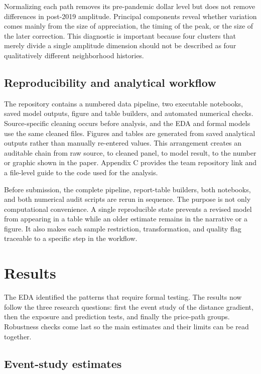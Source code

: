 \documentclass[11pt]{article}
\begin{document}
Normalizing each path removes its pre-pandemic dollar level but does not remove differences in post-2019 amplitude. Principal
components reveal whether variation comes mainly from the size of appreciation, the timing of the peak, or the size of the later
correction. This diagnostic is important because four clusters that merely divide a single amplitude dimension should not be
described as four qualitatively different neighborhood histories.

\subsection{Reproducibility and analytical workflow}

The repository contains a numbered data pipeline, two executable notebooks, saved model outputs, figure and table builders, and
automated numerical checks. Source-specific cleaning occurs before analysis, and the EDA and formal models use the same cleaned
files. Figures and tables are generated from saved analytical outputs rather than manually re-entered values. This arrangement
creates an auditable chain from raw source, to cleaned panel, to model result, to the number or graphic shown in the paper.
Appendix C provides the team repository link and a file-level guide to the code used for the analysis.

Before submission, the complete pipeline, report-table builders, both notebooks, and both numerical audit scripts are rerun in
sequence. The purpose is not only computational convenience. A single reproducible state prevents a revised model from appearing
in a table while an older estimate remains in the narrative or a figure. It also makes each sample restriction, transformation,
and quality flag traceable to a specific step in the workflow.

\section{Results}

The EDA identified the patterns that require formal testing. The results now follow the three research questions: first the event
study of the distance gradient, then the exposure and prediction tests, and finally the price-path groups. Robustness checks come
last so the main estimates and their limits can be read together.

\subsection{Event-study estimates}
\end{document}
